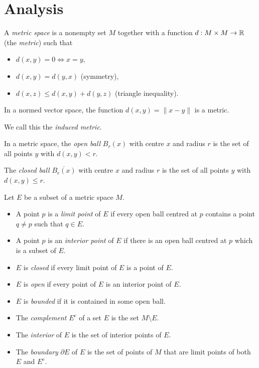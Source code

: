 \chapter{Analysis}
\begin{defn}
  A \emph{metric space} is a nonempty set $M$ together with a function
  $d:M\times M\to\mathbb{R}$ (the \emph{metric}) such that
  \begin{itemize}
    \item $d(x,y)=0\iff x=y$,
    \item $d(x,y)=d(y,x)$ (symmetry), 
    \item $d(x,z)\le d(x,y)+d(y,z)$ (triangle inequality).
  \end{itemize}
\end{defn}
\begin{prop}
  In a normed vector space, the function $d(x,y)=\|x-y\|$ is a metric.
\end{prop}
\begin{defn}
  We call this the \emph{induced metric}.
\end{defn}
\begin{defn}
  In a metric space, the \emph{open ball} $B_r(x)$ with centre $x$ and radius $r$ is the
  set of all points $y$ with $d(x,y)<r$.

  The \emph{closed ball} $\overline{B_r(x)}$ with centre $x$ and radius $r$ is
  the set of all points $y$ with $d(x,y)\le r$.
\end{defn}
\begin{defn}
  Let $E$ be a subset of a metric space $M$.
  \begin{itemize}
    \item A point $p$ is a \emph{limit point} of $E$ if every open ball centred
      at $p$ contains a point $q\ne p$ such that $q\in E$.
    \item A point $p$ is an \emph{interior point} of $E$ if there is an open
      ball centred at $p$ which is a subset of $E$.
    \item $E$ is \emph{closed} if every limit point of $E$ is a point of $E$.
    \item $E$ is \emph{open} if every point of $E$ is an interior point of $E$.
    \item $E$ is \emph{bounded} if it is contained in some open ball.
    \item The \emph{complement} $E^c$ of a set $E$ is the set $M\setminus E$.
    \item The \emph{interior} of $E$ is the set of interior points of $E$.
    \item The \emph{boundary} $\partial E$ of $E$ is the set of points of $M$
      that are limit points of both $E$ and $E^c$.
  \end{itemize}
\end{defn}
